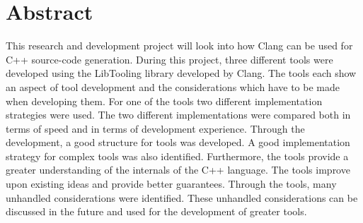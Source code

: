 \section*{Abstract}

This research and development project will look into how Clang can be used for C++ source-code generation. 
During this project, three different tools were developed using the LibTooling library developed by Clang.
The tools each show an aspect of tool development and the considerations which have to be made when developing them.
For one of the tools two different implementation strategies were used.
The two different implementations were compared both in terms of speed and in terms of development experience.
Through the development, a good structure for tools was developed. 
A good implementation strategy for complex tools was also identified.
Furthermore, the tools provide a greater understanding of the internals of the C++ language.
The tools improve upon existing ideas and provide better guarantees.
Through the tools, many unhandled considerations were identified.
These unhandled considerations can be discussed in the future and used for the development of greater tools. 